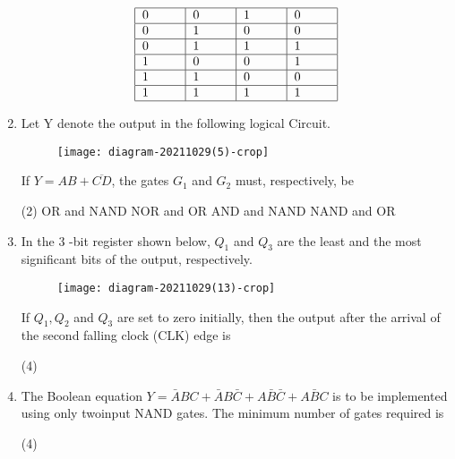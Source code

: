 \begin{enumerate}
\begin{align*}
\begin{tabular}{|p{1cm}|p{1cm}|p{1cm}|p{1cm}|}
	\hline 0 & 0 & 1 & 0 \\
	\hline 0 & 1 & 0 & 0 \\
	\hline 0 & 1 & 1 & 1 \\
	\hline 1 & 0 & 0 & 1 \\
	\hline 1 & 1 & 0 & 0 \\
	\hline 1 & 1 & 1 & 1 \\
	\hline
	\end{tabular}
	\end{align*}
	\item Let Y denote the output in the following logical Circuit.\\
	\begin{figure}[H]
		\centering	\texttt{[image: diagram-20211029(5)-crop]}
	\end{figure}
	If $Y=A B+\overline{C D}$, the gates $G_{1}$ and $G_{2}$ must, respectively, be
	{}
	\begin{tasks}(2)
		\task[\textbf{A.}] OR and NAND
		\task[\textbf{B.}] NOR and OR
		\task[\textbf{C.}] AND and NAND
		\task[\textbf{D.}] NAND and OR
	\end{tasks}
	\item In the 3 -bit register shown below, $Q_{1}$ and $Q_{3}$ are the least and the most significant bits of the output, respectively.\\
	\begin{figure}[H]
		\centering
		\texttt{[image: diagram-20211029(13)-crop]}
	\end{figure}
	If $Q_{1}, Q_{2}$ and $Q_{3}$ are set to zero initially, then the output after the arrival of the second falling clock (CLK) edge is
	{}
	\begin{tasks}(4)
	\end{tasks}
	\item The Boolean equation $Y=\bar{A} B C+\bar{A} B \bar{C}+A \bar{B} \bar{C}+A \bar{B} C$ is to be implemented using only twoinput NAND gates. The minimum number of gates required is
	{}
	\begin{tasks}(4)
	\end{tasks}
\end{enumerate}
\setlength\arrayrulewidth{1pt}
